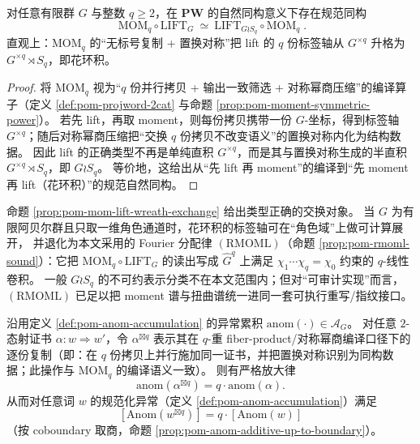 \begin{proposition}\label{prop:pom-mom-lift-wreath-exchange}\label{prop:pom-mom-lift-wreath}
对任意有限群 \(G\) 与整数 \(q\ge 2\)，在 \(\mathbf{PW}\) 的自然同构意义下存在规范同构
\[
\boxed{\;
\mathrm{MOM}_q\circ \mathrm{LIFT}_G
\ \simeq\
\mathrm{LIFT}_{G\wr S_q}\circ \mathrm{MOM}_q\; }.
\]
直观上：\(\mathrm{MOM}_q\) 的“无标号复制 + 置换对称”把 lift 的 \(q\) 份标签轴从 \(G^{\times q}\) 升格为 \(G^{\times q}\rtimes S_q\)，即花环积。
\end{proposition}

\begin{proof}
将 \(\mathrm{MOM}_q\) 视为“\(q\) 份并行拷贝 + 输出一致筛选 + 对称幂商压缩”的编译算子（定义 \ref{def:pom-projword-2cat} 与命题 \ref{prop:pom-moment-symmetric-power}）。
若先 lift，再取 moment，则每份拷贝携带一份 \(G\)-坐标，得到标签轴 \(G^{\times q}\)；随后对称幂商压缩把“交换 \(q\) 份拷贝不改变语义”的置换对称内化为结构数据。
因此 lift 的正确类型不再是单纯直积 \(G^{\times q}\)，而是其与置换对称生成的半直积 \(G^{\times q}\rtimes S_q\)，即 \(G\wr S_q\)。
等价地，这给出从“先 lift 再 moment”的编译到“先 moment 再 lift（花环积）”的规范自然同构。
\end{proof}

\begin{remark}\label{rem:pom-wreath-shadow-rmoml}
命题 \ref{prop:pom-mom-lift-wreath-exchange} 给出类型正确的交换对象。
当 \(G\) 为有限阿贝尔群且只取一维角色通道时，花环积的标签轴可在“角色域”上做可计算展开，
并退化为本文采用的 Fourier 分配律 \((\mathrm{RMOML})\)（命题 \ref{prop:pom-rmoml-sound}）：它把 \(\mathrm{MOM}_q\circ \mathrm{LIFT}_G\) 的读出写成 \(\widehat G^q\) 上满足 \(\chi_1\cdots\chi_q=\chi_0\) 约束的 \(q\)-线性卷积。
一般 \(G\wr S_q\) 的不可约表示分类不在本文范围内；但对“可审计实现”而言，\((\mathrm{RMOML})\) 已足以把 moment 谱与扭曲谱统一进同一套可执行重写/指纹接口。
\end{remark}

\begin{proposition}\label{prop:pom-anom-gap-amplification}
沿用定义 \ref{def:pom-anom-accumulation} 的异常累积 \(\mathrm{anom}(\cdot)\in\mathcal{A}_G\)。
对任意 \(2\)-态射证书 \(\alpha:w\Rightarrow w'\)，令 \(\alpha^{\boxtimes q}\) 表示其在 \(q\)-重 fiber-product/对称幂商编译口径下的逐份复制（即：在 \(q\) 份拷贝上并行施加同一证书，并把置换对称识别为同构数据；此操作与 \(\mathrm{MOM}_q\) 的编译语义一致）。
则有严格放大律
\[
\boxed{\;\mathrm{anom}(\alpha^{\boxtimes q})=q\cdot \mathrm{anom}(\alpha).\;}
\]
从而对任意词 \(w\) 的规范化异常（定义 \ref{def:pom-anom-accumulation}）满足
\[
\boxed{\;[\mathrm{Anom}(w^{\boxtimes q})]=q\cdot [\mathrm{Anom}(w)]\;}
\]
（按 coboundary 取商，命题 \ref{prop:pom-anom-additive-up-to-boundary}）。
\end{proposition}

